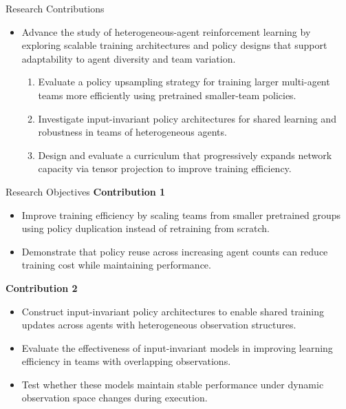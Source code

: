 \documentclass[xcolor={svgnames},aspectratio=169]{beamer}
\begin{document}
\begin{frame}{Research Contributions}
    \begin{itemize}
        \item {%
            Advance the study of heterogeneous-agent reinforcement learning by exploring 
            scalable training architectures and policy designs that support adaptability 
            to agent diversity and team variation.}
            \begin{enumerate}
                \item {%
                    Evaluate a policy upsampling strategy for training larger multi-agent teams 
                    more efficiently using pretrained smaller-team policies.}
                \item {%
                    Investigate input-invariant policy architectures for shared learning and 
                    robustness in teams of heterogeneous agents.}
                \item {%
                    Design and evaluate a curriculum that progressively expands network capacity 
                    via tensor projection to improve training efficiency.}
            \end{enumerate}
    \end{itemize}
\end{frame}

\begin{frame}{Research Objectives}
    \textbf{Contribution 1}
    \begin{itemize}
        \item {Improve training efficiency by scaling teams from smaller pretrained groups 
            using policy duplication instead of retraining from scratch.}
        \item {Demonstrate that policy reuse across increasing agent counts can reduce 
            training cost while maintaining performance.}
    \end{itemize}
    \vspace{1em}
    \textbf{Contribution 2}
    \begin{itemize}
        \item {Construct input-invariant policy architectures to enable shared training 
            updates across agents with heterogeneous observation structures.}
        \item {Evaluate the effectiveness of input-invariant models in improving learning 
            efficiency in teams with overlapping observations.}
        \item {Test whether these models maintain stable performance under dynamic 
            observation space changes during execution.}
    \end{itemize}
\end{frame}
\end{document}

